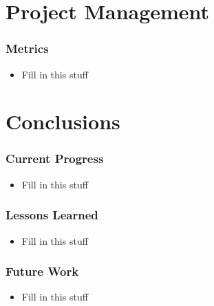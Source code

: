 \documentclass[final]{beamer}
\begin{document}
\section{Project Management}

\begin{frame}
	\frametitle{Metrics}
	\begin{beamerboxesrounded}[shadow]{}
		\begin{itemize}
			\item{Fill in this stuff}
		\end{itemize}
	\end{beamerboxesrounded}
\end{frame}

\section{Conclusions}

\begin{frame}
	\frametitle{Current Progress}
	\begin{beamerboxesrounded}[shadow]{}
		\begin{itemize}
			\item{Fill in this stuff}
		\end{itemize}
	\end{beamerboxesrounded}
\end{frame}

\begin{frame}
	\frametitle{Lessons Learned}
	\begin{beamerboxesrounded}[shadow]{}
		\begin{itemize}
			\item{Fill in this stuff}
		\end{itemize}
	\end{beamerboxesrounded}
\end{frame}

\begin{frame}
	\frametitle{Future Work}
	\begin{beamerboxesrounded}[shadow]{}
		\begin{itemize}
			\item{Fill in this stuff}
		\end{itemize}
	\end{beamerboxesrounded}
\end{frame}
\end{document}
